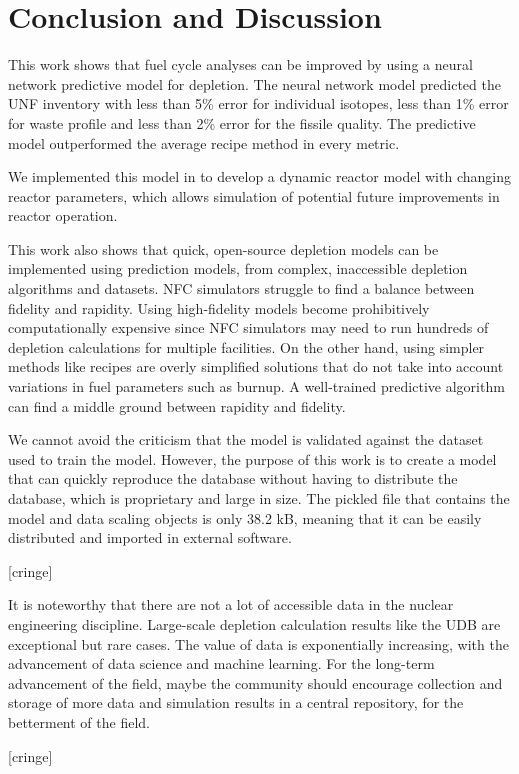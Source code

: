 \section{Conclusion and Discussion}
This work shows that fuel cycle analyses can be improved
by using a neural network predictive model for depletion.
The neural network model predicted the \gls{UNF} inventory
with less than 5\% error for individual isotopes,
less than 1\% error for waste profile 
and less than 2\% error for the fissile quality.
The predictive model outperformed the average recipe
method in every metric.

We implemented this model in \Cyclus to develop a
dynamic reactor model with changing reactor parameters,
which allows simulation of potential future improvements
in reactor operation.

This work also shows that quick, open-source depletion models
can be implemented using prediction models, from
complex, inaccessible depletion algorithms and
datasets. \gls{NFC} simulators struggle to find a balance
between fidelity and rapidity. Using high-fidelity
models become prohibitively computationally expensive
since \gls{NFC} simulators may need to run
hundreds of depletion calculations for multiple
facilities. On the other hand, using simpler methods
like recipes are overly simplified solutions
that do not take into account variations in fuel
parameters such as burnup.
A well-trained predictive algorithm can find a middle
ground between rapidity and fidelity.

We cannot avoid the criticism that the model is validated
against the dataset used to train the model. However, the purpose
of this work is to create a model that can quickly reproduce the
database without having to distribute the database, which is proprietary
and large in size. The pickled file that contains
the model and data scaling objects is only 38.2 kB, meaning that it
can be easily distributed and imported in external software.

[cringe]

It is noteworthy that there are not a lot of accessible data in the
nuclear engineering discipline. Large-scale depletion
calculation results like the \gls{UDB} are exceptional
but rare cases. The value of data is exponentially increasing,
with the advancement of data science and machine learning.
For the long-term advancement of the field, maybe the
community should encourage collection and storage of more
data and simulation results in
a central repository, for the betterment of the field.

[cringe]

